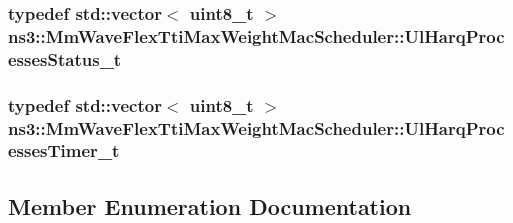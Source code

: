 \subsubsection[{\texorpdfstring{Ul\+Harq\+Processes\+Status\+\_\+t}{UlHarqProcessesStatus_t}}]{\setlength{\rightskip}{0pt plus 5cm}typedef std\+::vector$<$ uint8\+\_\+t $>$ {\bf ns3\+::\+Mm\+Wave\+Flex\+Tti\+Max\+Weight\+Mac\+Scheduler\+::\+Ul\+Harq\+Processes\+Status\+\_\+t}}\hypertarget{classns3_1_1MmWaveFlexTtiMaxWeightMacScheduler_a99865f7f1fd7470360def81114cae540}{}\label{classns3_1_1MmWaveFlexTtiMaxWeightMacScheduler_a99865f7f1fd7470360def81114cae540}
\subsubsection[{\texorpdfstring{Ul\+Harq\+Processes\+Timer\+\_\+t}{UlHarqProcessesTimer_t}}]{\setlength{\rightskip}{0pt plus 5cm}typedef std\+::vector$<$ uint8\+\_\+t $>$ {\bf ns3\+::\+Mm\+Wave\+Flex\+Tti\+Max\+Weight\+Mac\+Scheduler\+::\+Ul\+Harq\+Processes\+Timer\+\_\+t}}\hypertarget{classns3_1_1MmWaveFlexTtiMaxWeightMacScheduler_ab0bdc7347f33c61be33360a35c914a71}{}\label{classns3_1_1MmWaveFlexTtiMaxWeightMacScheduler_ab0bdc7347f33c61be33360a35c914a71}


\subsection{Member Enumeration Documentation}
